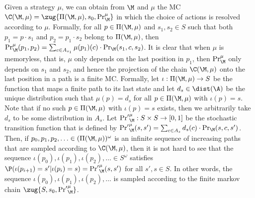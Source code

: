 \documentclass{lmcs}
\begin{document}
Given a strategy $\mu$, we can obtain from $\M$ and $\mu$ the MC $\C(\M,\mu) = \zug{\Pi(\M,\mu),s_0,\Pr_\M^\mu}$ in which the choice of actions is resolved according to $\mu$. Formally, for all $p\in \Pi(\M,\mu)$ and $s_1,s_2\in S$ such that both $p_1=p\cdot s_1$ and $p_2=p_1\cdot s_2$ belong to $\Pi(\M,\mu)$, then $\Pr_\M^\mu(p_1,p_2) = \sum_{c\in A_{s_1}}\mu(p_1)(c)\cdot \Pr_\M(s_1,c,s_2)$. 
It is clear that when $\mu$ is memoryless, that is, $\mu$ only depends on the last position in $p_1$, then ${\Pr}_\M^\mu$ only depends on $s_1$ and $s_2$, and hence the projection of the chain $\C(\M,\mu)$ onto the last position in a path is a finite MC. Formally, let $\iota:\Pi(\M,\mu)\rightarrow S$ be the function that maps a finite path to its last state and let $d_s\in \dist(\A)$ be the unique distribution such that $\mu(p)=d_s$ for all $p\in \Pi(\M,\mu)$ with $\iota(p)=s$. Note that if no such $p\in \Pi(\M,\mu)$ with $\iota(p)=s$ exists, then we arbitrarily take $d_s$ to be some distribution in $A_s$. 
Let ${\Pr'}_{\M}^\mu:S\times S\rightarrow [0,1]$ be the stochastic transition function that is defined by ${\Pr'}_\M^\mu(s,s')=\sum_{c\in A_{s}}d_s(c)\cdot \Pr_\M(s,c,s')$. Then, if $p_0,p_1,p_2,\ldots \in (\Pi(\M,\mu))^\omega$ is an infinite sequence of increasing paths that are sampled according to $\C(\M,\mu)$, then it is not hard to see that the sequence $\iota(p_0),\iota(p_1),\iota(p_2),\ldots \in S^\omega$ satisfies $\P(\iota(p_{i+1})=s'|\iota(p_i)=s)={\Pr'}_\M^\mu(s,s')$ for all $s',s\in S$. In other words, the sequence $\iota(p_0),\iota(p_1),\iota(p_2),\ldots$ is sampled according to the finite markov chain $\zug{S,s_0,{\Pr'}_\M^\mu}$.
\end{document}
